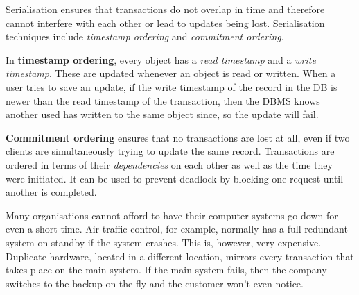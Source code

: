 \documentclass[../main.tex]{subfile}
\begin{document}

Serialisation ensures that transactions do not overlap in time and therefore cannot interfere with each other or lead to updates being lost. Serialisation techniques include \textit{timestamp ordering} and \textit{commitment ordering}.

In \textbf{timestamp ordering}, every object has a \textit{read timestamp} and a \textit{write timestamp}. These are updated whenever an object is read or written. When a user tries to save an update, if the write timestamp of the record in the DB is newer than the read timestamp of the transaction, then the DBMS knows another used has written to the same object since, so the update will fail.

\textbf{Commitment ordering} ensures that no transactions are lost at all, even if two clients are simultaneously trying to update the same record. Transactions are ordered in terms of their \textit{dependencies} on each other as well as the time they were initiated. It can be used to prevent deadlock by blocking one request until another is completed.


Many organisations cannot afford to have their computer systems go down for even a short time. Air traffic control, for example, normally has a full redundant system on standby if the system crashes. This is, however, very expensive. Duplicate hardware, located in a different location, mirrors every transaction that takes place on the main system. If the main system fails, then the company switches to the backup on-the-fly and the customer won't even notice.
\end{document}
